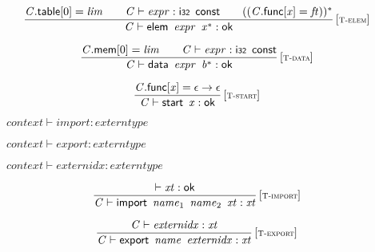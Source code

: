 $$
\begin{array}{@{}c@{}}\displaystyle
\frac{
{\mathit{C}}.\mathsf{table}{}[0] = {\mathit{lim}}
 \qquad
{\mathit{C}} \vdash {\mathit{expr}} : \mathsf{i{\scriptstyle32}}~\,\mathsf{const}
 \qquad
(({\mathit{C}}.\mathsf{func}{}[{\mathit{x}}] = {\mathit{ft}}))^\ast
}{
{\mathit{C}} \vdash \mathsf{elem}~\,{\mathit{expr}}~\,{{\mathit{x}}^\ast} : \mathsf{ok}
} \, {[\textsc{\scriptsize T{-}elem}]}
\qquad
\end{array}
$$

$$
\begin{array}{@{}c@{}}\displaystyle
\frac{
{\mathit{C}}.\mathsf{mem}{}[0] = {\mathit{lim}}
 \qquad
{\mathit{C}} \vdash {\mathit{expr}} : \mathsf{i{\scriptstyle32}}~\,\mathsf{const}
}{
{\mathit{C}} \vdash \mathsf{data}~\,{\mathit{expr}}~\,{{\mathit{b}}^\ast} : \mathsf{ok}
} \, {[\textsc{\scriptsize T{-}data}]}
\qquad
\end{array}
$$

$$
\begin{array}{@{}c@{}}\displaystyle
\frac{
{\mathit{C}}.\mathsf{func}{}[{\mathit{x}}] = \epsilon \rightarrow \epsilon
}{
{\mathit{C}} \vdash \mathsf{start}~\,{\mathit{x}} : \mathsf{ok}
} \, {[\textsc{\scriptsize T{-}start}]}
\qquad
\end{array}
$$

\vspace{1ex}

$\boxed{{\mathit{context}} \vdash {\mathit{import}} : {\mathit{externtype}}}$

$\boxed{{\mathit{context}} \vdash {\mathit{export}} : {\mathit{externtype}}}$

$\boxed{{\mathit{context}} \vdash {\mathit{externidx}} : {\mathit{externtype}}}$

$$
\begin{array}{@{}c@{}}\displaystyle
\frac{
{ \vdash }\;{\mathit{xt}} : \mathsf{ok}
}{
{\mathit{C}} \vdash \mathsf{import}~\,{\mathit{name}}_{{1}}~\,{\mathit{name}}_{{2}}~\,{\mathit{xt}} : {\mathit{xt}}
} \, {[\textsc{\scriptsize T{-}import}]}
\qquad
\end{array}
$$

$$
\begin{array}{@{}c@{}}\displaystyle
\frac{
{\mathit{C}} \vdash {\mathit{externidx}} : {\mathit{xt}}
}{
{\mathit{C}} \vdash \mathsf{export}~\,{\mathit{name}}~\,{\mathit{externidx}} : {\mathit{xt}}
} \, {[\textsc{\scriptsize T{-}export}]}
\qquad
\end{array}
$$

\vspace{1ex}

